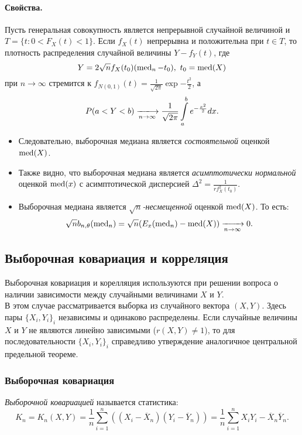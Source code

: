 \paragraph{Свойства.}
Пусть генеральная совокупность является непрерывной случайной величиной
и $T = \{t: 0 < F_X(t) < 1\}$. Если $f_X(t)$ непрерывна и положительна при
$t \in T$, то плотность распределения случайной величины $Y - f_Y(t)$, где
\[
  Y = 2 \sqrt{n} f_X(t_0) (\operatorname{med}_n - t_0),~ t_0 = \operatorname{med}(X)
\]
при $n \to \infty$ стремится к $f_{N(0, 1)}(t) = \frac{1}{\sqrt{2 \pi}}
\exp{-\frac{t^2}{2}}$, а
\[
  P(a < Y < b) \xlongrightarrow[n \to \infty]{} \frac{1}{\sqrt{2 \pi}}
  \int\limits_{a}^{b} e^{-\frac{x^2}{2}} dx
.\]
\begin{itemize}
  \item Следовательно, выборочная медиана является \textit{состоятельной}
  оценкой $\operatorname{med}(X)$.
  \item Также видно, что выборочная медиана является \textit{асимптотически
  нормальной} оценкой $\operatorname{med}(x)$ с асимптотической дисперсией
  $\Delta^2 = \frac{1}{r f^2_X(t_0)}$.
  \item Выборочная медиана является \textit{$\sqrt{n}$-несмещенной} оценкой
  $\operatorname{med}(X)$. То есть:
  \[
    \sqrt{n} b_{n, \theta} (\operatorname{med}_n) = \sqrt{n} (E_x(\operatorname{med}_n) - \operatorname{med}(X))
    \xrightarrow[n \to \infty]{} 0
  .\]
\end{itemize}



\subsection{Выборочная ковариация и корреляция}

Выборочная ковариация и корелляция используются при решении вопроса о наличии
зависимости между случайными величинами $X$ и $Y$.\\

В этом случае рассматривается выборка из случайного вектора $(X, Y)$. Здесь
пары $\{X_i, Y_i\}_i$ независимы и одинаково распределены. Если случайные
величины $X$ и $Y$ не являются линейно зависимыми ($r(X, Y) \neq 1$), то для
последовательности $\{X_i, Y_i\}_i$ справедливо утверждение аналогичное
центральной предельной теореме.

\subsubsection{Выборочная ковариация}

\begin{definition}
  \textit{Выборочной ковариацией} называется статистика:
  \[
    K_n = K_n(X, Y) = \frac{1}{n} \sum\limits_{i = 1}^{n}
    ((X_i - \overline{X}_n) (Y_i - \overline{Y}_n)) =
    \frac{1}{n} \sum\limits_{i = 1}^{n} X_i Y_i - \overline{X}_n \overline{Y}_n
  .\]
\end{definition}

